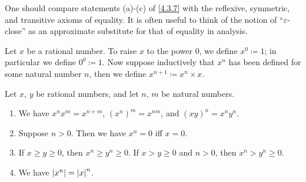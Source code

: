 \begin{rmk}\label{4.3.8}
	One should compare statements (a)-(c) of \cref{4.3.7} with the reflexive, symmetric, and transitive axioms of equality.
	It is often useful to think of the notion of ``\(\varepsilon\)-close'' as an approximate substitute for that of equality in analysis.
\end{rmk}

\begin{defn}\label{4.3.9}
	Let \(x\) be a rational number.
	To raise \(x\) to the power \(0\), we define \(x^0 \coloneqq 1\);
	in particular we define \(0^0 \coloneqq 1\).
	Now suppose inductively that \(x^n\) has been defined for some natural number \(n\), then we define \(x^{n+1} \coloneqq x^n \times x\).
\end{defn}

\begin{prop}\label{4.3.10}
	Let \(x\), \(y\) be rational numbers, and let \(n\), \(m\) be natural numbers.
	\begin{enumerate}
		\item We have \(x^n x^m = x^{n + m}\), \((x^n)^m = x^{nm}\), and \((xy)^n = x^n y^n\).
		\item Suppose \(n > 0\).
		      Then we have \(x^n = 0\) iff \(x = 0\).
		\item If \(x \geq y \geq 0\), then \(x^n \geq y^n \geq 0\).
		      If \(x > y \geq 0\) and \(n > 0\), then \(x^n > y^n \geq 0\).
		\item We have \(\left\lvert x^n\right\rvert = \left\lvert x\right\rvert^n\).
	\end{enumerate}
\end{prop}

